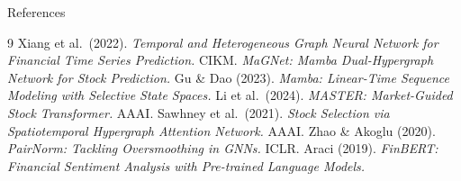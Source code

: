 \documentclass[aspectratio=169, 10pt]{beamer}
\begin{document}
\appendix

\begin{frame}{References}
  \footnotesize
  \begin{thebibliography}{9}
     Xiang et al.\ (2022). \textit{Temporal and Heterogeneous Graph
      Neural Network for Financial Time Series Prediction.} CIKM.
     \textit{MaGNet: Mamba Dual-Hypergraph Network for Stock Prediction.}
     Gu \& Dao (2023). \textit{Mamba: Linear-Time Sequence Modeling
      with Selective State Spaces.}
     Li et al.\ (2024). \textit{MASTER: Market-Guided Stock Transformer.} AAAI.
     Sawhney et al.\ (2021). \textit{Stock Selection via Spatiotemporal
      Hypergraph Attention Network.} AAAI.
     Zhao \& Akoglu (2020). \textit{PairNorm: Tackling Oversmoothing
      in GNNs.} ICLR.
     Araci (2019). \textit{FinBERT: Financial Sentiment Analysis with
      Pre-trained Language Models.}
  \end{thebibliography}
\end{frame}
\end{document}
